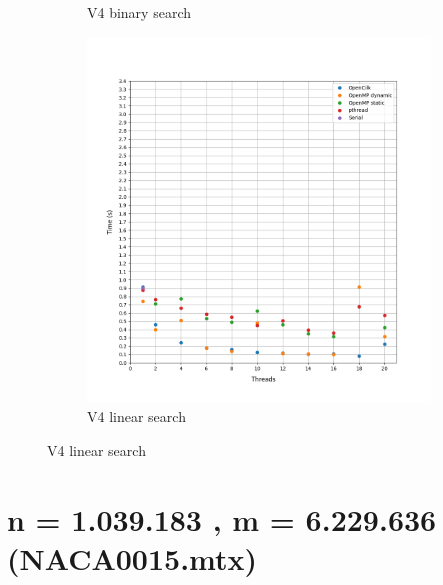\documentclass[12pt, a4paper]{article}
\begin{document}
\begin{figure}[h!]
\begin{subfigure}[b]{0.33\textwidth}
         \caption{V4 binary search}
     \end{subfigure}
     \begin{subfigure}[b]{0.33\textwidth}
         \centering
         \includegraphics[height=.4\textheight, width=\textwidth, keepaspectratio]{assets/mycielskian/v4_linear.png}
         \caption{V4 linear search} 
     \end{subfigure}
\end{figure}


\section{n = 1.039.183 , m = 6.229.636 (NACA0015.mtx)}
\end{document}
